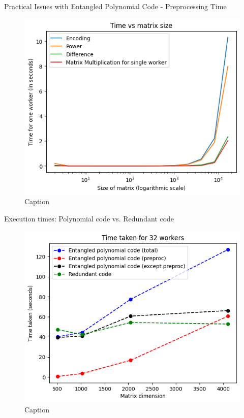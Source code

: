 \documentclass{beamer}
\begin{document}
\begin{frame}{Practical Issues with Entangled Polynomial Code - Preprocessing Time}
    \begin{figure}[H]
        \centering
        \includegraphics[scale=0.5]{../plots/encoding_time_single_worker_vs_matrix_size}
        \caption{Caption}
    \end{figure}
\end{frame}

\begin{frame}{Execution times: Polynomial code vs. Redundant code}
    \begin{figure}[H]
        \centering
        \includegraphics[scale=0.5]{../plots/time_vs_matsize.png}
        \caption{Caption}
    \end{figure}
\end{frame}
\end{document}
